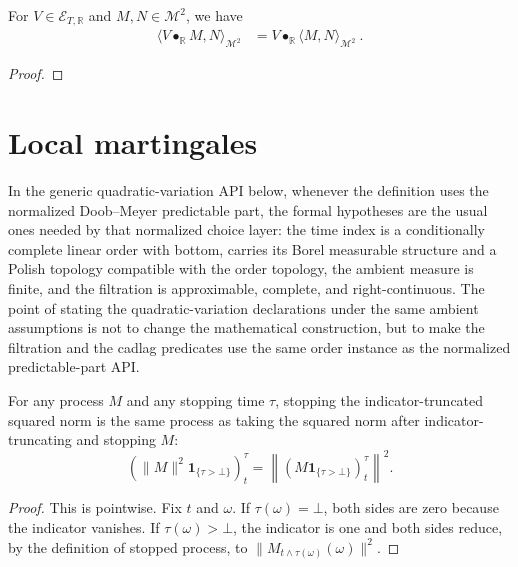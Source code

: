 \begin{lemma}\label{lem:inner_elemStochIntegral}
For $V \in \mathcal{E}_{T, \mathbb{R}}$ and $M, N \in \mathcal{M}^2$, we have
\begin{align*}
  \langle V \bullet_{\mathbb{R}} M, N \rangle_{\mathcal{M}^2}
  &= V \bullet_{\mathbb{R}} \langle M, N \rangle_{\mathcal{M}^2}
  \: .
\end{align*}
\end{lemma}

\begin{proof}

\end{proof}





\section{Local martingales}

In the generic quadratic-variation API below, whenever the definition uses the
normalized Doob--Meyer predictable part, the formal hypotheses are the usual
ones needed by that normalized choice layer: the time index is a conditionally
complete linear order with bottom, carries its Borel measurable structure and a
Polish topology compatible with the order topology, the ambient measure is
finite, and the filtration is approximable, complete, and right-continuous.
The point of stating the quadratic-variation declarations under the same
ambient assumptions is not to change the mathematical construction, but to make
the filtration and the cadlag predicates use the same order instance as the
normalized predictable-part API.


\begin{lemma}\label{lem:stoppedProcess_indicator_sq_norm}
For any process $M$ and any stopping time $\tau$, stopping the
indicator-truncated squared norm is the same process as taking the squared norm
after indicator-truncating and stopping $M$:
\[
  \left(\|M\|^2 \mathbf{1}_{\{\tau>\bot\}}\right)^\tau_t
  =
  \left\| \left(M\mathbf{1}_{\{\tau>\bot\}}\right)^\tau_t \right\|^2 .
\]
\end{lemma}

\begin{proof}

This is pointwise.  Fix $t$ and $\omega$.  If \(\tau(\omega)=\bot\), both
sides are zero because the indicator vanishes.  If \(\tau(\omega)>\bot\), the
indicator is one and both sides reduce, by the definition of stopped process, to
\(\|M_{t\wedge \tau(\omega)}(\omega)\|^2\).
\end{proof}


